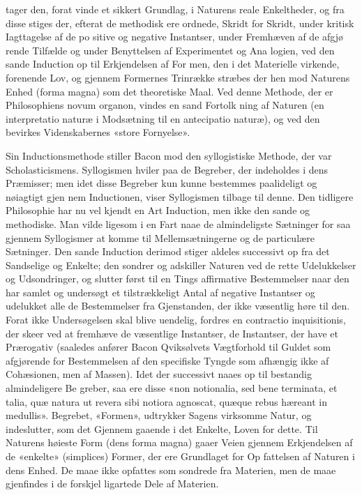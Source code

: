 \documentclass[12pt,a4paper]{book}
\begin{document}
tager den, forat vinde et sikkert Grundlag, i Naturens reale
Enkeltheder, og fra disse stiges der, efterat de methodisk ere
ordnede, Skridt for Skridt, under kritisk Iagttagelse af de po\-%
sitive og negative Instantser, under Fremhæven af de afgjø\-%
rende Tilfælde og under Benyttelsen af Experimentet og Ana\-%
logien, ved den sande Induction op til Erkjendelsen af For\-%
men, den i det Materielle virkende, forenende Lov, og gjennem
Formernes Trinrække stræbes der hen mod Naturens Enhed
(forma magna) som det theoretiske Maal. Ved denne Methode,
der er Philosophiens novum organon, vindes en sand Fortolk\-%
ning af Naturen (en interpretatio naturæ i Modsætning til en
antecipatio naturæ), og ved den bevirkes Videnskabernes «store
Fornyelse».

Sin Inductionsmethode stiller Bacon mod den syllogistiske
Methode, der var Scholasticismens. Syllogismen hviler paa de
Begreber, der indeholdes i dens Præmisser; men idet disse
Begreber kun kunne bestemmes paalideligt og nøiagtigt gjen\-%
nem Inductionen, viser Syllogismen tilbage til denne. Den
tidligere Philosophie har nu vel kjendt en Art Induction, men
ikke den sande og methodiske. Man vilde ligesom i en Fart
naae de almindeligste Sætninger for saa gjennem Syllogismer at
komme til Mellemsætningerne og de particulære Sætninger.
Den sande Induction derimod stiger aldeles successivt op fra
det Sandselige og Enkelte; den sondrer og adskiller Naturen
ved de rette Udelukkelser og Udsondringer, og slutter først til
en Tings affirmative Bestemmelser naar den har samlet og
undersøgt et tilstrækkeligt Antal af negative Instantser og
udelukket alle de Bestemmelser fra Gjenstanden, der ikke
væsentlig høre til den. Forat ikke Undersøgelsen skal blive
uendelig, fordres en contractio inquisitionis, der skeer ved at
fremhæve de væsentlige Instantser, de Instantser, der have et
Prærogativ (saaledes anfører Bacon Qviksølvets Vægtforhold til
Guldet som afgjørende for Bestemmelsen af den specifiske
Tyngde som afhængig ikke af Cohæsionen, men af Massen).
Idet der successivt naaes op til bestandig almindeligere Be\-%
greber, saa ere disse «non notionalia, sed bene terminata, et
talia, quæ natura ut revera sibi notiora agnoscat, quæque
rebus hæreant in medullis». Begrebet, «Formen», udtrykker
Sagens virksomme Natur, og indeslutter, som det Gjennem\-%
gaaende i det Enkelte, Loven for dette. Til Naturens høieste
Form (dens forma magna) gaaer Veien gjennem Erkjendelsen
af de «enkelte» (simplices) Former, der ere Grundlaget for Op\-%
fattelsen af Naturen i dens Enhed. De maae ikke opfattes som
sondrede fra Materien, men de maae gjenfindes i de forskjel\-%
ligartede Dele af Materien.
\end{document}
